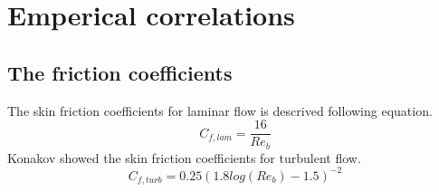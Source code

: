 \documentclass[conference]{IEEEtran}
\begin{document}
%


\section{Emperical correlations}
\subsection{The friction coefficients}
The skin friction coefficients for laminar flow is descrived following equation.
\begin{equation}
    C_{f,lam}=\frac{16}{Re_{b}}
    \label{cf_laminar}
\end{equation}
Konakov\cite{Konakov1954} showed the skin friction coefficients for turbulent flow.
\begin{equation}
    C_{f,turb}=0.25(1.8log(Re_{b})-1.5)^{-2}
    \label{cf_turbulent}
\end{equation}
\end{document}
